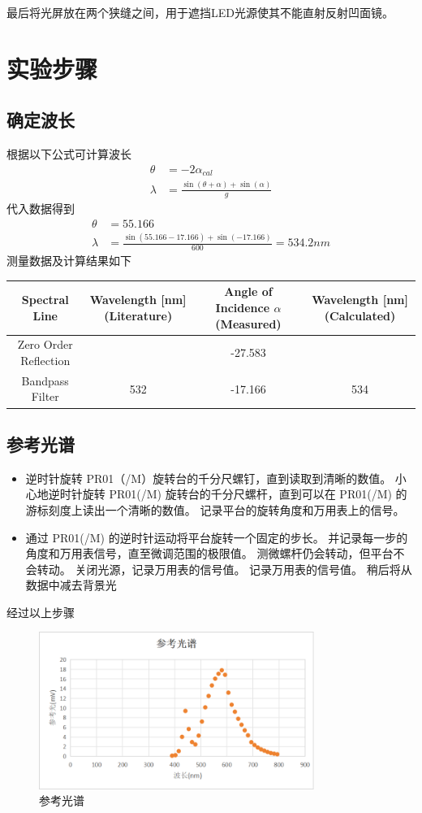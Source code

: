 \documentclass{ctexart}
\begin{document}
最后将光屏放在两个狭缝之间，用于遮挡LED光源使其不能直射反射凹面镜。

\section{实验步骤}
\subsection{确定波长}
根据以下公式可计算波长
\begin{align}
    \theta &= -2 \alpha_{cal} \\
    \lambda &= \frac{\sin(\theta+\alpha)+\sin(\alpha)}{g}
\end{align}
代入数据得到
\begin{align}
    \theta &= 55.166 \\
    \lambda &= \frac{\sin(55.166-17.166)+\sin(-17.166)}{600} = 534.2nm
\end{align}
测量数据及计算结果如下
\begin{table}[h]
    \centering
    \begin{tabular}{|c|c|c|c|}
        \hline
        \rowcolor{yellow!25} Spectral Line & Wavelength [nm] (Literature)  & Angle of Incidence $\alpha$ (Measured) & Wavelength [nm] (Calculated)   \\
        \hline
        Zero Order Reflection & \- & -27.583 & \-  \\
        \hline
        Bandpass Filter & 532 & -17.166 & 534  \\
        \hline
    \end{tabular}
\end{table}
\subsection{参考光谱}
\begin{itemize}
    \item 逆时针旋转 PR01（/M）旋转台的千分尺螺钉，直到读取到清晰的数值。
    小心地逆时针旋转 PR01(/M) 旋转台的千分尺螺杆，直到可以在 PR01(/M) 的游标刻度上读出一个清晰的数值。
    记录平台的旋转角度和万用表上的信号。
    \item 通过 PR01(/M) 的逆时针运动将平台旋转一个固定的步长。
    并记录每一步的角度和万用表信号，直至微调范围的极限值。
    测微螺杆仍会转动，但平台不会转动。
    关闭光源，记录万用表的信号值。
    记录万用表的信号值。 稍后将从数据中减去背景光
\end{itemize}
经过以上步骤
\begin{figure}[H]
    \centering
    \includegraphics[width=0.8\textwidth]{pictures/图片1.png}
    \caption{参考光谱}
\end{figure}
\end{document}
